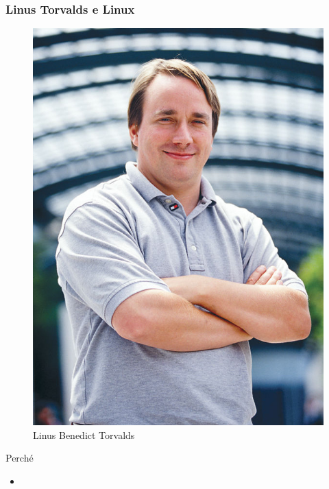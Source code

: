 \documentclass{beamer}
\begin{document}
\begin{frame}
    \frametitle{Linus Torvalds e Linux}

    \begin{minipage}{.4\linewidth}
    \begin{figure}
        \includegraphics[width=.9\linewidth]{img/torvalds.jpeg}
        \caption{Linus Benedict Torvalds}
        \end{figure}
    \end{minipage}
    \begin{minipage}{.55\linewidth}
        \begin{block}{Perché}
            \begin{itemize}
                \item

\end{itemize}
\end{block}
\end{minipage}
\end{frame}
\end{document}
